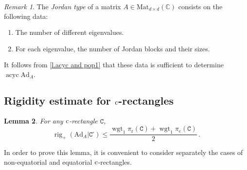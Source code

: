 \documentclass[10pt, a4paper]{amsart}
\theoremstyle{plain}
\newtheorem{lemma}{Lemma}[section]
\theoremstyle{definition}
\theoremstyle{remark}
\theoremstyle{note}
\newtheorem{rem}[lemma]{Remark}
\numberwithin{equation}{section}
\begin{document}
\begin{rem}\label{r.jordan type and acyc}
The \emph{Jordan type} of a matrix $A \in {\mathrm{Mat}}_{d \times d}({\mathbb{C}})$ consists 
on the following data: 
\begin{enumerate}
\item The number of different eigenvalues.
\item For each eigenvalue, the number of Jordan blocks and their sizes.
\end{enumerate}
It follows from \cref{l.acyc and pop1} that these data is sufficient to
determine $\operatorname{acyc} {\mathrm{Ad}}_A$.
\end{rem}

\subsection{Rigidity estimate for $\rm c$-rectangles}

\begin{lemma}\label{l.rig island}
For any $\rm c$-rectangle ${\mathtt{C}}$,	
$$
\operatorname{rig}_+ ({\mathrm{Ad}}_A | {\mathtt{C}}^\square) \le \frac{\operatorname{wgt}_1 {\pi_\mathrm{r}}({\mathtt{C}}) + \operatorname{wgt}_1 {\pi_\mathrm{c}}({\mathtt{C}})}{2} \, .
$$
\end{lemma}

In order to prove this lemma, it is convenient to consider separately
the cases of non-equatorial and equatorial $\rm c$-rectangles.
\end{document}
